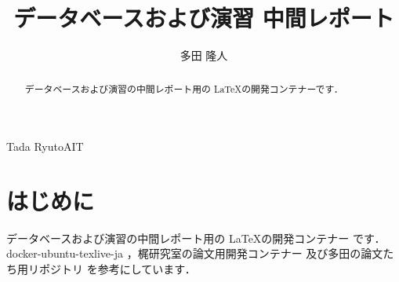 \documentclass[submit,techrep]{ipsj}
\begin{document}
\title{データベースおよび演習 中間レポート}

\author{多田 隆人}{Tada Ryuto}{AIT}

\begin{abstract}
  データベースおよび演習の中間レポート用の \LaTeX の開発コンテナーです．
\end{abstract}

\maketitle

\section{はじめに}

データベースおよび演習の中間レポート用の \LaTeX の開発コンテナー \cite{latex-devcontainer} です．
docker-ubuntu-texlive-ja \cite{docker-ubuntu-texlive-ja}，梶研究室の論文用開発コンテナー \cite{kajilab-latex-devcontainer} 及び多田の論文たち用リポジトリ \cite{kajilab-papers} を参考にしています．


\end{document}
